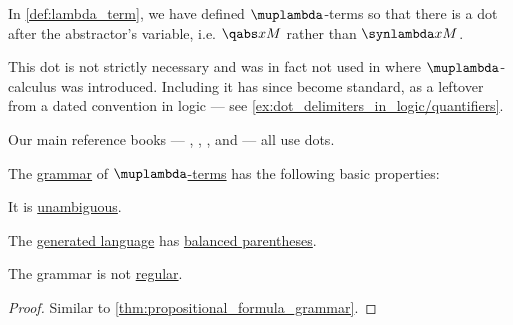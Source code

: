 \begin{remark}\label{rem:lambda_term_abstractor_dot}
  In \cref{def:lambda_term}, we have defined \( \muplambda \)-terms so that there is a dot after the abstractor's variable, i.e. \( \qabs x M \) rather than \( \synlambda x M \).

  This dot is not strictly necessary and was in fact not used in \cite{Church1932LambdaCalculus} where \( \muplambda \)-calculus was introduced. Including it has since become standard, as a leftover from a dated convention in logic --- see \cref{ex:dot_delimiters_in_logic/quantifiers}.

  Our main reference books --- \cite[def. 1A1]{Hindley1997BasicSTT}, \cite[22]{Barendregt1984LambdaCalculus}, \cite[15]{GirardEtAl1989ProofsAndTypes}, \cite[\S A.2.4]{UnivalentFoundationsProgram2013HoTT} and \cite[\S 4.1.3]{Mimram2020ProgramEqualsProof} --- all use dots.
\end{remark}

\begin{proposition}\label{thm:lambda_term_grammar}
  The \hyperref[def:formal_grammar]{grammar} of \hyperref[def:lambda_term]{\( \muplambda \)-terms} has the following basic properties:
  \begin{thmenum}
     It is \hyperref[def:grammar_ambiguity]{unambiguous}.

     The \hyperref[def:formal_grammar/language]{generated language} has \hyperref[def:paired_delimiters]{balanced parentheses}.

     The grammar is not \hyperref[def:chomsky_hierarchy/regular]{regular}.
  \end{thmenum}
\end{proposition}
\begin{proof}
  Similar to \cref{thm:propositional_formula_grammar}.
\end{proof}

